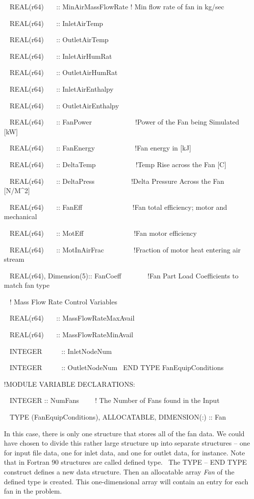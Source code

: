 ~ REAL(r64)~~~ :: MinAirMassFlowRate ! Min flow rate of fan in kg/sec

~ REAL(r64)~~~ :: InletAirTemp

~ REAL(r64)~~~ :: OutletAirTemp

~ REAL(r64)~~~ :: InletAirHumRat

~ REAL(r64)~~~ :: OutletAirHumRat

~ REAL(r64)~~~ :: InletAirEnthalpy

~ REAL(r64)~~~ :: OutletAirEnthalpy

~ REAL(r64)~~~ :: FanPower~~~~~~~~~~~~ !Power of the Fan being Simulated {[}kW{]}

~ REAL(r64)~~~ :: FanEnergy~~~~~~~~~~~ !Fan energy in {[}kJ{]}

~ REAL(r64)~~~ :: DeltaTemp~~~~~~~~~~~ !Temp Rise across the Fan {[}C{]}

~ REAL(r64)~~~ :: DeltaPress~~~~~~~~~~ !Delta Pressure Across the Fan {[}N/M\^{}2{]}

~ REAL(r64)~~~ :: FanEff~~~~~~~~~~~~~~ !Fan total efficiency; motor and mechanical

~ REAL(r64)~~~ :: MotEff~~~~~~~~~~~~~~ !Fan motor efficiency

~ REAL(r64)~~~ :: MotInAirFrac~~~~~~~~ !Fraction of motor heat entering air stream

~ REAL(r64), Dimension(5):: FanCoeff~~~~~~~ !Fan Part Load Coefficients to match fan type

~ ! Mass Flow Rate Control Variables

~ REAL(r64)~~~ :: MassFlowRateMaxAvail

~ REAL(r64)~~~ :: MassFlowRateMinAvail

~ INTEGER~~~~~ :: InletNodeNum

~ INTEGER~~~~~ :: OutletNodeNum ~END TYPE FanEquipConditions

!MODULE VARIABLE DECLARATIONS:

~ INTEGER :: NumFans~~~~ ! The Number of Fans found in the Input

~ TYPE (FanEquipConditions), ALLOCATABLE, DIMENSION(:) :: Fan

In this case, there is only one structure that stores all of the fan data. We could have chosen to divide this rather large structure up into separate structures -- one for input file data, one for inlet data, and one for outlet data, for instance. Note that in Fortran 90 structures are called defined type.~ The TYPE -- END TYPE construct defines a new data structure. Then an allocatable array \emph{Fan} of the defined type is created. This one-dimensional array will contain an entry for each fan in the problem.


